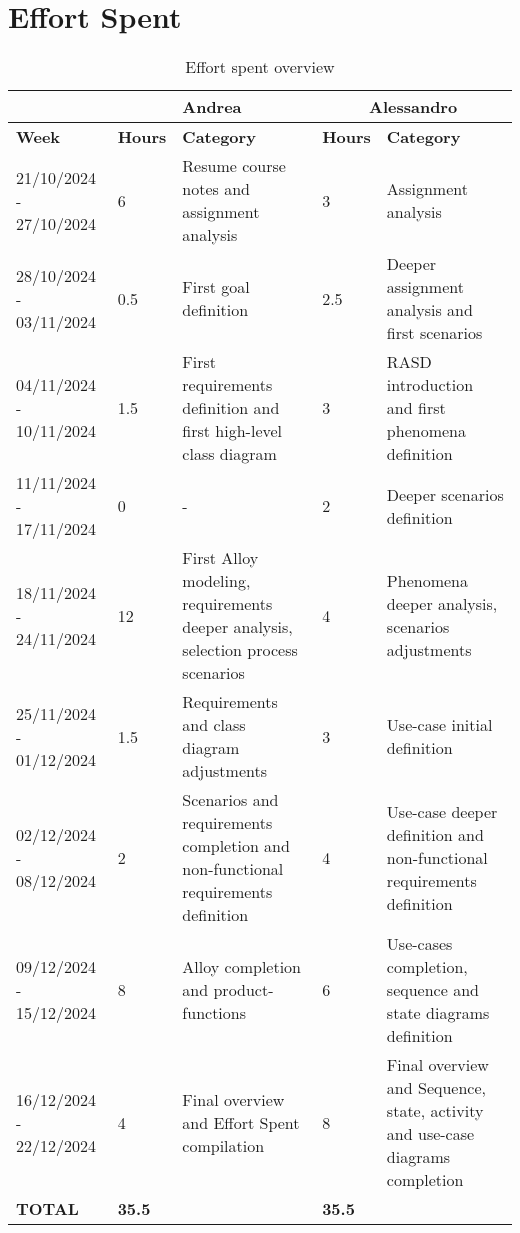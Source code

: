 \chapter{Effort Spent}
	\begin{center}
		\begin{table}[H]
			\begin{tabular}{ | m{3.2cm} | m{1cm}| m{4cm} | m{1.5cm}| m{4cm} | } 
				\hline
					&  \multicolumn{2}{c|}{ Andrea} & \multicolumn{2}{c|}{ Alessandro} \\ 
				\hline
					\textbf{Week} & \textbf{Hours}   & \textbf{Category} & \textbf{Hours}       & \textbf{Category} \\
				\hline
					21/10/2024 - 27/10/2024 & 6 & Resume course notes and assignment analysis & 3 & Assignment analysis\\
				\hline
					28/10/2024 - 03/11/2024 & 0.5 & First goal definition & 2.5 & Deeper assignment analysis and first scenarios \\
				\hline
					04/11/2024 - 10/11/2024 & 1.5 & First requirements definition and first high-level class diagram & 3 & RASD introduction and first phenomena definition\\
				\hline
					11/11/2024 - 17/11/2024 & 0 & - & 2 & Deeper scenarios definition \\
				\hline
					18/11/2024 - 24/11/2024 & 12 & First Alloy modeling, requirements deeper analysis, selection process scenarios & 4 & Phenomena deeper analysis, scenarios adjustments\\
				\hline
					25/11/2024 - 01/12/2024 & 1.5 & Requirements and class diagram adjustments & 3 & Use-case initial definition \\
				\hline
					02/12/2024 - 08/12/2024 & 2 & Scenarios and requirements completion and non-functional requirements definition & 4 & Use-case deeper definition and non-functional requirements definition\\
				\hline
					09/12/2024 - 15/12/2024 & 8 & Alloy completion and product-functions & 6 & Use-cases completion, sequence and state diagrams definition\\
				\hline
					16/12/2024 - 22/12/2024 & 4 & Final overview and Effort Spent compilation & 8 & Final overview and Sequence, state, activity and use-case diagrams completion \\
				\hline
					\textbf{TOTAL} & \textbf{35.5} & & \textbf{35.5} & \\
				\hline
			\end{tabular}
			\caption{Effort spent overview}
		\end{table}
	\end{center}